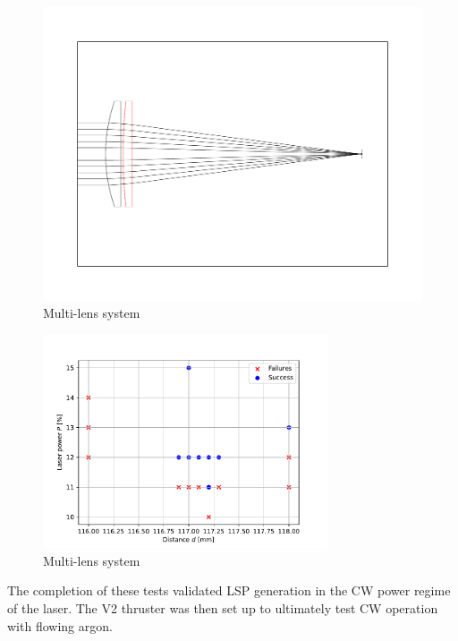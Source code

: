             \begin{figure}[h]
                \centering
                \includegraphics[width=\textwidth]{assets/4 experiments/500 and 150 lenses.pdf}
                \caption{Multi-lens system}
            \end{figure}


            \begin{figure}[h]
                \centering
                \includegraphics[width=0.75\textwidth]{assets/4 experiments/duallens_focus_threshold.pdf}
                \caption{Multi-lens system}
            \end{figure}


            The completion of these tests validated LSP generation in the CW power regime of the laser. The V2 thruster was then set up to ultimately test CW operation with flowing argon.
        
